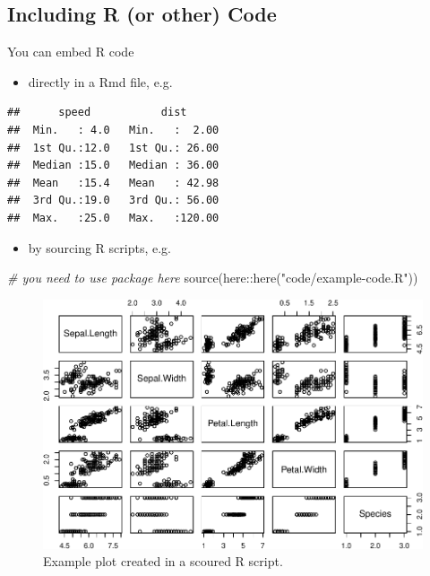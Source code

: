 \documentclass[
]{scrartcl}
\newenvironment{Shaded}{\begin{snugshade}}{\end{snugshade}}
\newcommand{\CommentTok}[1]{\textcolor[rgb]{0.56,0.35,0.01}{\textit{#1}}}
\newcommand{\FunctionTok}[1]{\textcolor[rgb]{0.00,0.00,0.00}{#1}}
\newcommand{\NormalTok}[1]{#1}
\newcommand{\SpecialCharTok}[1]{\textcolor[rgb]{0.00,0.00,0.00}{#1}}
\newcommand{\StringTok}[1]{\textcolor[rgb]{0.31,0.60,0.02}{#1}}
\providecommand{\tightlist}{%
  \setlength{\itemsep}{0pt}\setlength{\parskip}{0pt}}
\begin{document}
\hypertarget{including-r-or-other-code}{%
\subsection{Including R (or other) Code}\label{including-r-or-other-code}}

You can embed R code

\begin{itemize}
\tightlist
\item
  directly in a Rmd file, e.g.
\end{itemize}

\begin{verbatim}
##      speed           dist       
##  Min.   : 4.0   Min.   :  2.00  
##  1st Qu.:12.0   1st Qu.: 26.00  
##  Median :15.0   Median : 36.00  
##  Mean   :15.4   Mean   : 42.98  
##  3rd Qu.:19.0   3rd Qu.: 56.00  
##  Max.   :25.0   Max.   :120.00
\end{verbatim}

\begin{itemize}
\tightlist
\item
  by sourcing R scripts, e.g.
\end{itemize}

\begin{Shaded}
\begin{Highlighting}[]
\CommentTok{\# you need to use package \textasciigrave{}here\textasciigrave{}}
\FunctionTok{source}\NormalTok{(here}\SpecialCharTok{::}\FunctionTok{here}\NormalTok{(}\StringTok{"code/example{-}code.R"}\NormalTok{))}
\end{Highlighting}
\end{Shaded}

\begin{figure}
\centering
\includegraphics{00_thesis_files/figure-latex/sourcing-1.pdf}
\caption{\label{fig:sourcing}Example plot created in a scoured R script.}
\end{figure}
\end{document}
